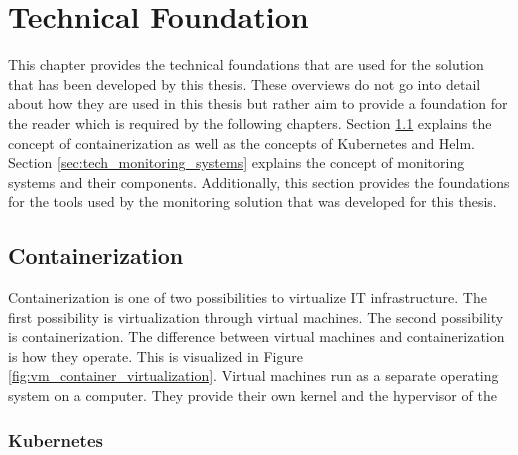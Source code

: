 \chapter{Technical Foundation}
\label{cha:technical_foundation}

This chapter provides the technical foundations that are used for the solution that has been developed by this thesis.
These overviews do not go into detail about how they are used in this thesis but rather aim to provide
a foundation for the reader which is required by the following chapters.
Section \ref{sec:tech_containerization} explains the concept of containerization as well as the concepts of Kubernetes and Helm.
Section \ref{sec:tech_monitoring_systems} explains the concept of monitoring systems and their components.
Additionally, this section provides the foundations for the tools used by the monitoring solution that was developed for this thesis.

\section{Containerization}
\label{sec:tech_containerization}


Containerization is one of two possibilities to virtualize IT infrastructure.
The first possibility is virtualization through virtual machines.
The second possibility is containerization. The difference between virtual machines
and containerization is how they operate. This is visualized in Figure \ref{fig:vm_container_virtualization}.
Virtual machines run as a separate operating system on a computer.
They provide their own kernel and the hypervisor of the

\cite{DOC-DOCS}

\subsection*{Kubernetes}


\cite{KUB-DOCS}

